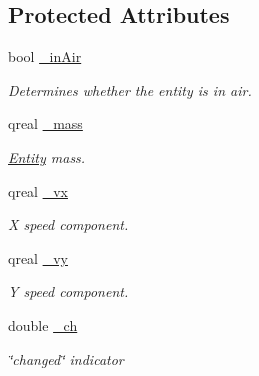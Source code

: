 \subsection*{Protected Attributes}
\begin{DoxyCompactItemize}
\item 
\mbox{\label{class_dynamic_entity_ad3e9a2006ac1a488e7ddfe7bca09a77c}} 
bool \hyperlink{class_dynamic_entity_ad3e9a2006ac1a488e7ddfe7bca09a77c}{\+\_\+in\+Air}
\begin{DoxyCompactList}\small\item\em Determines whether the entity is in air. \end{DoxyCompactList}\item 
\mbox{\label{class_dynamic_entity_a28c8f427e535b66825c908671f3e8bf2}} 
qreal \hyperlink{class_dynamic_entity_a28c8f427e535b66825c908671f3e8bf2}{\+\_\+mass}
\begin{DoxyCompactList}\small\item\em \hyperlink{class_entity}{Entity} mass. \end{DoxyCompactList}\item 
\mbox{\label{class_dynamic_entity_ab8251cd7a23dc31ef6210761ef6964da}} 
qreal \hyperlink{class_dynamic_entity_ab8251cd7a23dc31ef6210761ef6964da}{\+\_\+vx}
\begin{DoxyCompactList}\small\item\em X speed component. \end{DoxyCompactList}\item 
\mbox{\label{class_dynamic_entity_ad2304e29b50422faeca0289d3aed5857}} 
qreal \hyperlink{class_dynamic_entity_ad2304e29b50422faeca0289d3aed5857}{\+\_\+vy}
\begin{DoxyCompactList}\small\item\em Y speed component. \end{DoxyCompactList}\item 
\mbox{\label{class_dynamic_entity_a2b2463df5558ee7e071382027b5caa51}} 
double \hyperlink{class_dynamic_entity_a2b2463df5558ee7e071382027b5caa51}{\+\_\+ch}
\begin{DoxyCompactList}\small\item\em \char`\"{}changed\char`\"{} indicator \end{DoxyCompactList}\end{DoxyCompactItemize}


